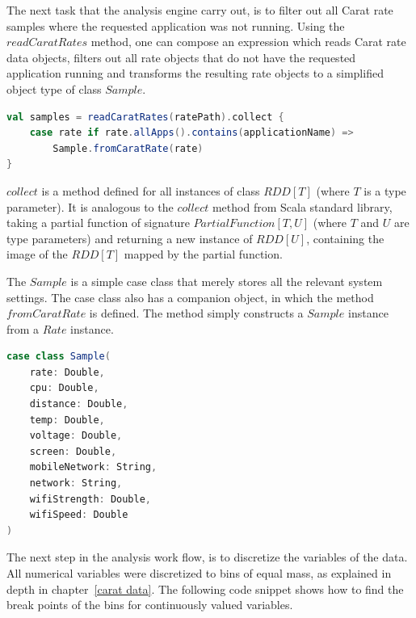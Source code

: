 The next task that the analysis engine carry out, is to filter out all Carat rate samples where the requested application was not running. Using the $readCaratRates$ method, one can compose an expression which reads Carat rate data objects, filters out all rate objects that do not have the requested application running and transforms the resulting rate objects to a simplified object type of class $Sample$. 

\begin{minipage}{0.95\linewidth}
\begin{lstlisting}[language=scala]
val samples = readCaratRates(ratePath).collect {
	case rate if rate.allApps().contains(applicationName) => 
		Sample.fromCaratRate(rate)
}
\end{lstlisting}
\end{minipage}
  
$collect$ is a method defined for all instances of class $RDD[T]$ (where $T$ is a type parameter). It is analogous to the $collect$ method from Scala standard library, taking a partial function of signature $PartialFunction[T, U]$  (where $T$ and $U$ are type parameters) and returning a new instance of $RDD[U]$, containing the image of the $RDD[T]$ mapped by the partial function.
        
The $Sample$ is a simple case class that merely stores all the relevant system settings. The case class also has a companion object, in which the method $fromCaratRate$ is defined. The method simply constructs a $Sample$ instance from a $Rate$ instance. 

\begin{minipage}{0.95\linewidth}
\begin{lstlisting}[language=scala]
case class Sample(
	rate: Double,
	cpu: Double,
	distance: Double,
	temp: Double,
	voltage: Double,
	screen: Double,
	mobileNetwork: String,
	network: String,
	wifiStrength: Double,
	wifiSpeed: Double
)
\end{lstlisting}
\end{minipage}  

The next step in the analysis work flow, is to discretize the variables of the data. All numerical variables were discretized to bins of equal mass, as explained in depth in chapter~\ref{carat data}. The following code snippet shows how to find the break points of the bins for continuously valued variables.

